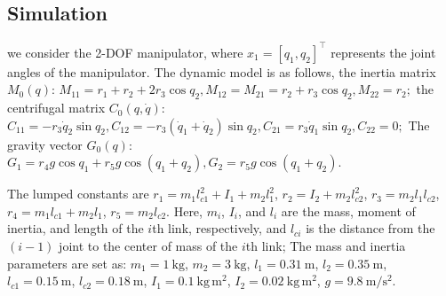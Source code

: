 \documentclass[pdflatex,sn-mathphys-num]{sn-jnl}%
\theoremstyle{thmstyleone}%
\theoremstyle{thmstyletwo}%
\theoremstyle{thmstylethree}%
\begin{document}
\subsection{Simulation}
\par we consider the 2-DOF manipulator, where $x_1 = [q_1, q_2]^{\top}$ represents the joint angles of the manipulator. The dynamic model is as follows, the inertia matrix $M_0(q)$:
$M_{11}=r_1+r_2+2r_3\cos q_2, M_{12}=M_{21}=r_2+r_3\cos q_2, M_{22}=r_2;$
the centrifugal matrix $C_0(q,\dot q)$:
$C_{11}=-r_3\dot q_2\sin q_2, C_{12}=-r_3(\dot q_1+\dot q_2)\sin q_2, C_{21}=r_3\dot q_1\sin q_2, C_{22}=0;$
The gravity vector $G_0(q)$:
$G_1=r_4 g\cos q_1+r_5 g\cos(q_1+q_2), G_2=r_5 g\cos(q_1+q_2).$



The lumped constants are \( r_1 = m_1 l_{c1}^2 + I_1 + m_2 l_1^2 \),
\( r_2 = I_2 + m_2 l_{c2}^2 \),
\( r_3 = m_2 l_1 l_{c2} \),
\( r_4 = m_1 l_{c1} + m_2 l_1 \),
\( r_5 = m_2 l_{c2} \).
Here, \(m_i\), \(I_i\), and \(l_i\) are the mass, moment of inertia, and length of the \(i\)th link, respectively, and \(l_{ci}\) is the distance from the $(i-1)$ joint to the center of mass of the \(i\)th link; The mass and inertia parameters are set as: \( m_1 = 1 \ \mathrm{kg} \), \( m_2 = 3 \ \mathrm{kg} \), \( l_1 = 0.31 \ \mathrm{m} \), \( l_2 = 0.35 \ \mathrm{m} \), \( l_{c1} = 0.15 \ \mathrm{m} \), \( l_{c2} = 0.18 \ \mathrm{m} \), \( I_1 = 0.1 \ \mathrm{kg \, m^2} \), \( I_2 = 0.02 \ \mathrm{kg \, m^2} \), \( g = 9.8 \ \mathrm{m/s^2} \).
\end{document}
